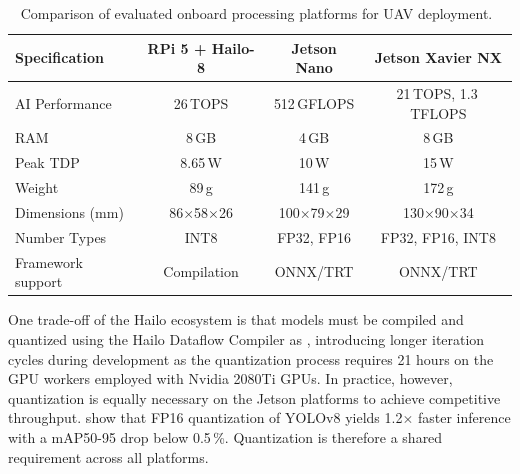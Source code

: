 \documentclass[12pt,oneside,bibtotoc,liststotoc]{scrbook}
\begin{document}
\begin{table}[H]
    \centering
    \caption{Comparison of evaluated onboard processing platforms for UAV deployment.~\cite{raspberryPi5datasheet2026,hailo8_m2datasheet2021,jetsonNanoComputeModuleDatasheet2024,jetsonNanoDeveloperKitSpecification2020, jetsonNanoDeveloperKitWeight2019, jetsonXavierNXDatasheet2020, jetsonXavierNXDevKitSpecification2020, jetsonXavierNXDevkitWeight}}
    \label{tab:opu_comparison}
    \scriptsize
    \setlength{\tabcolsep}{4pt}
    \begin{tabular}{|lccc|}
        \toprule
        \rowcolor{white}
        \textbf{Specification} & \textbf{RPi 5 + Hailo-8} & \textbf{Jetson Nano}    & \textbf{Jetson Xavier NX} \\
        \midrule
        AI Performance         & 26\,TOPS                 & 512\,GFLOPS             & 21\,TOPS, 1.3\,TFLOPS     \\ %
        RAM                    & 8\,GB                    & 4\,GB                   & 8\,GB                     \\ %
        Peak TDP               & 8.65\,W                  & 10\,W                   & 15\,W                     \\ %
        Weight                 & 89\,g                    & 141\,g                  & 172\,g                    \\ %
        Dimensions (mm)        & 86$\times$58$\times$26   & 100$\times$79$\times$29 & 130$\times$90$\times$34   \\
        Number Types           & INT8                     & FP32, FP16              & FP32, FP16, INT8          \\
        Framework support      & Compilation              & ONNX/TRT                & ONNX/TRT                  \\
        \bottomrule
    \end{tabular}
\end{table}

One trade-off of the Hailo ecosystem is that models must be
compiled and quantized using the Hailo Dataflow Compiler as ,
introducing longer iteration cycles during development as the
quantization process requires 21 hours on the GPU workers employed
with Nvidia 2080Ti GPUs.
In practice, however, quantization is equally necessary on
the Jetson platforms to achieve competitive throughput.
\citet{filippou2025edge} show that FP16 quantization of
YOLOv8 yields 1.2$\times$ faster inference with a
mAP50-95 drop below 0.5\,\%. Quantization is therefore a
shared requirement across all platforms.
\end{document}
